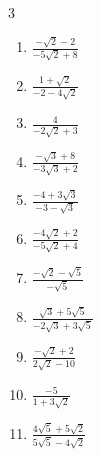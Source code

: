 \begin{multicols}{3}
\begin{enumerate}

  \item $\displaystyle \frac{-\sqrt{2}-2}{-5\sqrt{2}+8}$


  \item $\displaystyle \frac{1+\sqrt{2}}{-2-4\sqrt{2}}$


\columnbreak %

  \item $\displaystyle \frac{4}{-2\sqrt{2}+3}$


  \item $\displaystyle \frac{-\sqrt{3}+8}{-3\sqrt{3}+2}$


  \item $\displaystyle \frac{-4+3\sqrt{3}}{-3-\sqrt{3}}$


  \item $\displaystyle \frac{-4\sqrt{2}+2}{-5\sqrt{2}+4}$


  \item $\displaystyle \frac{-\sqrt{2}-\sqrt{5}}{-\sqrt{5}}$


\columnbreak %

  \item $\displaystyle \frac{\sqrt{3}+5\sqrt{5}}{-2\sqrt{3}+3\sqrt{5}}$


  \item $\displaystyle \frac{-\sqrt{2}+2}{2\sqrt{2}-10}$


  \item $\displaystyle \frac{-5}{1+3\sqrt{2}}$


  \item $\displaystyle \frac{4\sqrt{5}+5\sqrt{2}}{5\sqrt{5}-4\sqrt{2}}$


\end{enumerate}
\end{multicols}
